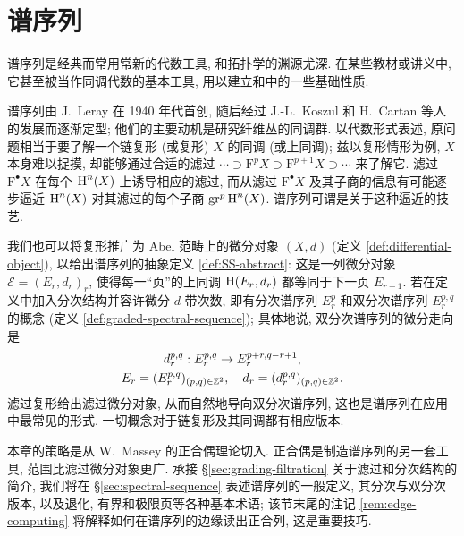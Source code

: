 
\chapter{谱序列}\label{sec:ss}
谱序列是经典而常用常新的代数工具, 和拓扑学的渊源尤深. 在某些教材或讲义中, 它甚至被当作同调代数的基本工具, 用以建立和中的一些基础性质.

谱序列由 J.\ Leray 在 1940 年代首创, 随后经过 J.-L.\ Koszul 和 H.\ Cartan 等人的发展而逐渐定型; 他们的主要动机是研究纤维丛的同调群. 以代数形式表述, 原问题相当于要了解一个链复形 (或复形) $X$ 的同调 (或上同调); 兹以复形情形为例, $X$ 本身难以捉摸, 却能够通过合适的滤过 $\cdots \supset \mathrm{F}^p X \supset \mathrm{F}^{p+1} X \supset \cdots$ 来了解它. 滤过 $\mathrm{F}^\bullet X$ 在每个 $\operatorname{H}^n(X)$ 上诱导相应的滤过, 而从滤过 $\mathrm{F}^\bullet X$ 及其子商的信息有可能逐步逼近 $\operatorname{H}^n(X)$ 对其滤过的每个子商 $\operatorname{gr}^p \operatorname{H}^n(X)$. 谱序列可谓是关于这种逼近的技艺.

我们也可以将复形推广为 Abel 范畴上的微分对象 $(X, d)$ (定义 \ref{def:differential-object}), 以给出谱序列的抽象定义 \ref{def:SS-abstract}: 这是一列微分对象 $\mathscr{E} = (E_r, d_r)_r$, 使得每一``页''的上同调 $\operatorname{H}(E_r, d_r)$ 都等同于下一页 $E_{r+1}$. 若在定义中加入分次结构并容许微分 $d$ 带次数, 即有分次谱序列 $E_r^p$ 和双分次谱序列 $E_r^{p, q}$ 的概念 (定义 \ref{def:graded-spectral-sequence}); 具体地说, 双分次谱序列的微分走向是
\begin{gather*}
	d_r^{p, q}: E_r^{p, q} \to E_r^{p+r, q-r+1}, \\
	E_r = (E_r^{p, q})_{(p, q) \in \mathbb{Z}^2}, \quad d_r = (d_r^{p, q})_{(p, q) \in \mathbb{Z}^2}.
\end{gather*}
滤过复形给出滤过微分对象, 从而自然地导向双分次谱序列, 这也是谱序列在应用中最常见的形式. 一切概念对于链复形及其同调都有相应版本.

本章的策略是从 W.\ Massey 的正合偶理论切入. 正合偶是制造谱序列的另一套工具, 范围比滤过微分对象更广. 承接 \S\ref{sec:grading-filtration} 关于滤过和分次结构的简介, 我们将在 \S\ref{sec:spectral-sequence} 表述谱序列的一般定义, 其分次与双分次版本, 以及退化, 有界和极限页等各种基本术语; 该节末尾的注记 \ref{rem:edge-computing} 将解释如何在谱序列的边缘读出正合列, 这是重要技巧.

